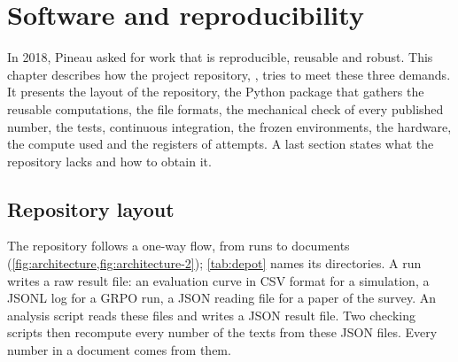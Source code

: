 \chapter{Software and reproducibility}
\label{chap:08-logiciel}

In 2018, Pineau asked for work that is reproducible, reusable and robust. This chapter describes how
the project repository, \repo, tries to meet these three demands. It presents the layout of the
repository, the Python package that gathers the reusable computations, the file formats, the
mechanical check of every published number, the tests, continuous integration, the frozen
environments, the hardware, the compute used and the registers of attempts. A last section states what the repository lacks and
how to obtain it.

\section{Repository layout}
\label{sec:depot}

The repository follows a one-way flow, from runs to documents
(\cref{fig:architecture,fig:architecture-2}); \cref{tab:depot} names its directories. A run writes
a raw result file: an evaluation curve in CSV format for a simulation, a JSONL log for a GRPO run, a
JSON reading file for a paper of the survey. An analysis script reads these files and writes a JSON
result file. Two checking scripts then recompute every number of the texts from these JSON files.
Every number in a document comes from them.



